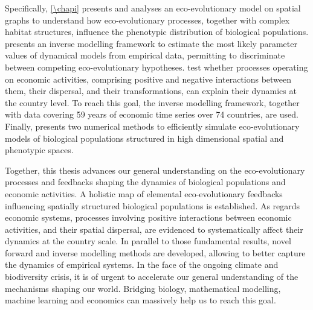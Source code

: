 {Specifically, \cref{\chapi} presents and analyses an eco-evolutionary model on spatial graphs to understand how eco-evolutionary processes, together with complex habitat structures, influence the phenotypic distribution of biological populations. \Cref{\chapii} presents an inverse modelling framework to estimate the most likely parameter values of dynamical models from empirical data, permitting to discriminate between competing eco-evolutionary hypotheses. \Cref{\chapiv} test whether processes operating on economic activities, comprising positive and negative interactions between them, their dispersal, and their transformations, can explain their dynamics at the country level. To reach this goal, the inverse modelling framework, together with data covering 59 years of economic time series over 74 countries, are used. Finally, \Cref{\chapiv} presents two numerical methods to efficiently simulate eco-evolutionary models of biological populations structured in high dimensional spatial and phenotypic spaces.

Together, this thesis advances our general understanding on the eco-evolutionary processes and feedbacks shaping the dynamics of biological populations and economic activities. A holistic map of elemental eco-evolutionary feedbacks influencing spatially structured biological populations is established. As regards economic systems, processes involving positive interactions between economic activities, and their spatial dispersal, are evidenced to systematically affect their dynamics at the country scale.
% 
In parallel to those fundamental results, novel forward and inverse modelling methods are developed, allowing to better capture the dynamics of empirical systems.
% 
In the face of the ongoing climate and biodiversity crisis, it is of urgent to accelerate our general understanding of the mechanisms shaping our world.
% 
Bridging biology, mathematical modelling, machine learning and economics can massively help us to reach this goal.
}



